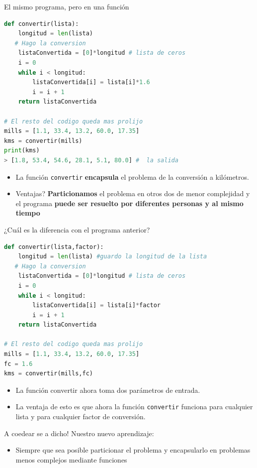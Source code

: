 \documentclass{beamer}
\begin{document}
\begin{frame}[fragile]{El mismo programa, pero en una función} \pause

\begin{lstlisting}[language=Python]
def convertir(lista):
    longitud = len(lista) 
   # Hago la conversion
    listaConvertida = [0]*longitud # lista de ceros
    i = 0
    while i < longitud:
        listaConvertida[i] = lista[i]*1.6
        i = i + 1
    return listaConvertida

# El resto del codigo queda mas prolijo
mills = [1.1, 33.4, 13.2, 60.0, 17.35]
kms = convertir(mills)
print(kms)
> [1.8, 53.4, 54.6, 28.1, 5.1, 80.0] #  la salida
\end{lstlisting} \pause

\begin{itemize}
    \item La función \texttt{convertir} \textbf{encapsula} el problema de la conversión a kilómetros. \pause
    \item Ventajas? \pause \textbf{Particionamos} el problema en otros dos de menor complejidad y el programa \textbf{puede ser resuelto por diferentes personas y al mismo tiempo}
\end{itemize}
\end{frame}



\begin{frame}[fragile]{¿Cuál es la diferencia con el programa anterior?} \pause

\begin{lstlisting}[language=Python]
def convertir(lista,factor):
    longitud = len(lista) #guardo la longitud de la lista
   # Hago la conversion
    listaConvertida = [0]*longitud # lista de ceros
    i = 0
    while i < longitud:
        listaConvertida[i] = lista[i]*factor
        i = i + 1
    return listaConvertida

# El resto del codigo queda mas prolijo
mills = [1.1, 33.4, 13.2, 60.0, 17.35]
fc = 1.6
kms = convertir(mills,fc)
\end{lstlisting} \pause

\begin{itemize}
    \item La función convertir ahora toma dos parámetros de entrada. \pause
    \item La ventaja de esto es que ahora la función \texttt{convertir} funciona para cualquier lista y para cualquier factor de conversión.
\end{itemize}
\end{frame}






\begin{frame}{A coedear se a dicho!} \pause
Nuestro nuevo aprendizaje:  \pause
\begin{itemize}
	\item Siempre que sea posible \alert{particionar} el problema y \alert{encapsularlo} en problemas menos complejos mediante \alert{funciones}
\end{itemize} 
\end{frame}
\end{document}
